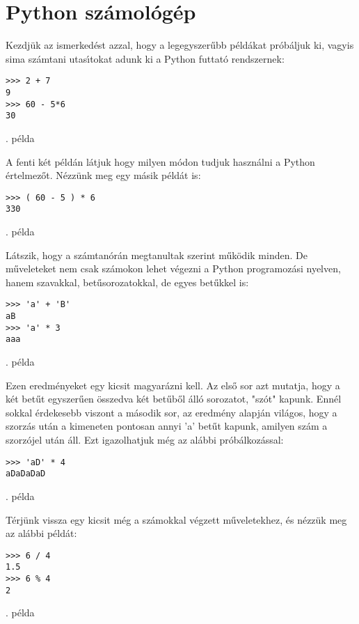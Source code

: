\documentclass[12pt]{article}
\newcounter{minta}[section]
\newcommand{\incminta}{\stepcounter{minta}}
\newcommand{\pelda}{\stepcounter{minta} \theminta. p\'elda \vspace{5mm}}
\begin{document}
\section{Python sz\'amol\'og\'ep}

Kezdj\"uk az ismerked\'est azzal, hogy a legegyszer\H{u}bb p\'eld\'akat pr\'ob\'aljuk ki, vagyis 
sima sz\'amtani utas\'{\i}tokat adunk ki a Python futtat\'o rendszernek: 

\incminta
\begin{Verbatim}[fontsize=\small]
>>> 2 + 7
9
>>> 60 - 5*6
30
\end{Verbatim}
\theminta. p\'elda

\noindent A fenti k\'et p\'eld\'an l\'atjuk hogy milyen m\'odon tudjuk haszn\'alni a Python \'ertel\-me\-z\H{o}t. 
N\'ezz\"unk meg egy m\'asik p\'eld\'at is:

\incminta
\begin{Verbatim}[fontsize=\small]
>>> ( 60 - 5 ) * 6
330
\end{Verbatim}
\theminta. p\'elda

\noindent L\'atszik, hogy a sz\'amtan\'or\'an megtanultak szerint m\H{u}k\"odik minden. De m\H{u}\-ve\-le\-te\-ket nem 
csak sz\'amokon lehet v\'egezni a Python programoz\'asi nyelven, hanem szavakkal, bet\H{u}sorozatokkal, de 
egyes bet\H{u}kkel is:

\incminta
\begin{Verbatim}[fontsize=\small]
>>> 'a' + 'B'
aB
>>> 'a' * 3
aaa
\end{Verbatim}
\theminta. p\'elda

\noindent Ezen eredm\'enyeket egy kicsit magyar\'azni kell. Az els\H{o} sor azt mutatja, hogy a k\'et bet\H{u}t 
egyszer\H{u}en \"osszedva k\'et bet\H{u}b\H{o}l \'all\'o sorozatot, "sz\'ot" kapunk.  Enn\'el sokkal 
\'erdekesebb viszont a m\'asodik sor, az eredm\'eny alapj\'an vil\'agos, hogy a szorz\'as ut\'an a 
kimeneten pontosan annyi 'a' bet\H{u}t kapunk, amilyen sz\'am a szorz\'ojel ut\'an \'all. Ezt igazolhatjuk 
m\'eg az al\'abbi pr\'ob\'alkoz\'assal:

\begin{Verbatim}[fontsize=\small]
>>> 'aD' * 4
aDaDaDaD
\end{Verbatim}
\pelda

\noindent T\'erj\"unk vissza egy kicsit m\'eg a sz\'amokkal v\'egzett m\H{u}veletekhez, \'es n\'ezz\"uk meg az al\'abbi 
p\'eld\'at:

\incminta
\begin{Verbatim}[fontsize=\small]
>>> 6 / 4
1.5
>>> 6 % 4
2
\end{Verbatim}
\theminta. p\'elda
\end{document}
